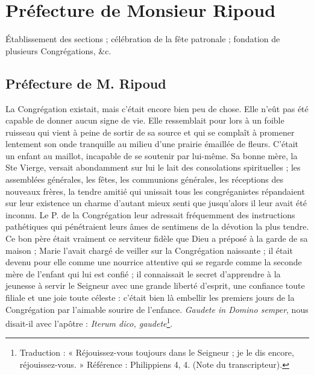 \chapter{Préfecture de Monsieur Ripoud}
\begin{center}
Établissement des sections ; célébration de la fête patronale ; fondation de plusieurs Congrégations, \&c.
\end{center}

\section*{Préfecture de M. Ripoud}
La Congrégation existait, mais c'était encore bien peu de chose. Elle n'eût pas été capable de donner aucun signe de vie. Elle ressemblait pour lors à un foible ruisseau qui vient à peine de sortir de sa source et qui se complaît
à promener lentement son onde tranquille au milieu d'une prairie émaillée de fleurs. C'était un enfant au maillot, incapable de se soutenir par lui-même. Sa bonne mère, la Ste Vierge, versait abondamment sur lui le lait des consolations spirituelles ; les assemblées générales, les fêtes, les communions générales, les réceptions des nouveaux frères, la tendre amitié qui unissait tous les congréganistes répandaient sur leur existence un charme d'autant mieux senti que jusqu'alors il leur avait été inconnu. Le P. de la Congrégation leur adressait fréquemment des instructions pathétiques qui pénétraient leurs âmes de sentimens de la dévotion la plus tendre. Ce bon père était vraiment ce serviteur fidèle que Dieu a préposé à la garde de sa maison ; Marie l'avait chargé de veiller sur la Congrégation naissante ; il était devenu pour elle comme une nourrice attentive qui se regarde comme la seconde mère de l'enfant qui lui est confié ; il connaissait le secret d'apprendre à la jeunesse à servir le Seigneur avec une grande liberté d'esprit, une confiance toute filiale et une joie toute céleste : c'était bien là embellir les premiers jours de la Congrégation par l'aimable sourire de l'enfance. \textit{Gaudete in Domino semper}, nous disait-il avec l'apôtre : \textit{Iterum dico, gaudete}\footnote{Traduction : « Réjouissez-vous toujours dans le Seigneur ; je le dis encore, réjouissez-vous. » Référence : Philippiens 4, 4. (Note du transcripteur).}.

